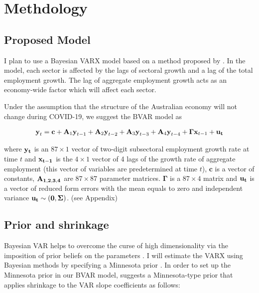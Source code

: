 \documentclass{monashthesis}
\begin{document}
\hypertarget{methdology}{%
\chapter{Methdology}\label{methdology}}

\hypertarget{proposed-model}{%
\section{Proposed Model}\label{proposed-model}}

I plan to use a Bayesian VARX model based on a method proposed by \textcite{anderson2020}. In the model, each sector is affected by the lags of sectoral growth and a lag of the total employment growth. The lag of aggregate employment growth acts as an economy-wide factor which will affect each sector.

Under the assumption that the structure of the Australian economy will not change during COVID-19, we suggest the BVAR model as

\[
\begin{aligned}
\textbf{y}_t=\textbf{c}+\textbf{A}_1 \textbf{y}_{t-1}+\textbf{A}_2\textbf{y}_{t-2}+\textbf{A}_3\textbf{y}_{t-3}+\textbf{A}_4\textbf{y}_{t-4}+\boldsymbol{\Gamma}\textbf{x}_{t-1}+\bf{u}_t
\end{aligned}
\]

where \(\bf{y}_t\) is an \(87\times1\) vector of two-digit subsectoral employment growth rate at time \(t\) and \(\bf{x}_{t-1}\) is the \(4\times1\) vector of 4 lags of the growth rate of aggregate employment (this vector of variables are predetermined at time \(t\)), \(\textbf{c}\) is a vector of constants, \(\bf{A}_{1,2,3,4}\) are \(87\times87\) parameter matrices. \(\boldsymbol{\Gamma}\) is a \(87\times4\) matrix and \(\bf{u}_t\) is a vector of reduced form errors with the mean equals to zero and independent variance \(\bf{u}_t \sim (0,\boldsymbol{\Sigma})\). (see Appendix)

\hypertarget{prior-and-shrinkage}{%
\section{Prior and shrinkage}\label{prior-and-shrinkage}}

Bayesian VAR helps to overcome the curse of high dimensionality via the imposition of prior beliefs on the parameters \autocite{banbura2010large}. I will estimate the VARX using Bayesian methods by specifying a Minnesota prior \autocites[e.g.][]{anderson2020,litterman1986,robertson1999vector}. In order to set up the Minnesota prior in our BVAR model, \textcite{banbura2010large} suggests a Minnesota-type prior that applies shrinkage to the VAR slope coefficients as follows:
\end{document}
